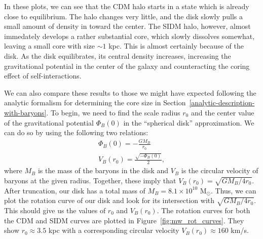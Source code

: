 In these plots, we can see that the CDM halo starts in a state which is already
close to equilibrium. The halo changes very little, and the disk slowly pulls
a small amount of density in toward the center. The SIDM halo, however, almost
immedately develops a rather substantial core, which slowly dissolves somewhat,
leaving a small core with size $\sim 1$ kpc. This is almost certainly because
of the disk. As the disk equilibrates, its central density increases,
increasing the gravitational potential in the center of the galaxy and
counteracting the coring effect of self-interactions.

We can also compare these results to those we might have expected following the
analytic formalism for determining the core size in
Section~\ref{analytic-description-with-baryons}. To begin, we need to find the
scale radius $r_0$ and the center value of the gravitational potential
$\Phi_B(0)$ in the ``spherical disk'' approximation. We can do so by using the
following two relations:
\begin{gather}
    \Phi_B(0) = - \frac{G M_B}{r_0} \\
    V_B(r_0) = \frac{\sqrt{-\Phi_B(0)}}{2},
\end{gather}
where $M_B$ is the mass of the baryons in the disk and $V_B$ is the circular
velocity of baryons at the given radius. Together, these imply that $V_B(r_0) =
\sqrt{G M_B / 4 r_0}$.  After truncation, our disk has a total mass of $M_B =
8.1 \times 10^{10}$ M$_\odot$.  Thus, we can plot the rotation curve of our
disk and look for its intersection with $\sqrt{G M_B / 4 r_0}$.  This should
give us the values of $r_0$ and $V_B(r_0)$.  The rotation curves for both the
CDM and SIDM curves are plotted in Figure~\ref{fig:mw_rot_curves}. They show
$r_0 \approx 3.5$ kpc with a corresponding circular velocity $V_B(r_0) \approx
160$ km/s. 

